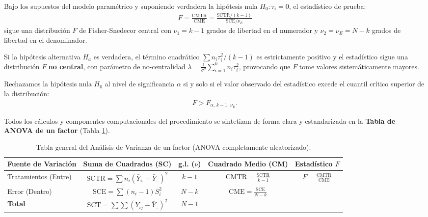 \begin{teorema}
	Bajo los supuestos del modelo paramétrico y suponiendo verdadera la hipótesis nula $H_0: \tau_i = 0$, el estadístico de prueba:
	\begin{align}
		F = \frac{\text{CMTR}}{\text{CME}} = \frac{\text{SCTR} / (k - 1)}{\text{SCE} / \nu_E}
	\end{align}
	sigue una distribución $F$ de Fisher-Snedecor central con $\nu_1 = k - 1$ grados de libertad en el numerador y $\nu_2 = \nu_E = N - k$ grados de libertad en el denominador.

	Si la hipótesis alternativa $H_a$ es verdadera, el término cuadrático $\sum n_i \tau_i^2 / (k-1)$ es estrictamente positivo y el estadístico sigue una distribución $F$ \textbf{no central}, con parámetro de no-centralidad $\lambda = \frac{1}{\sigma^2}\sum_{i=1}^k n_i \tau_i^2$, provocando que $F$ tome valores sistemáticamente mayores.

	Rechazamos la hipótesis nula $H_0$ al nivel de significancia $\alpha$ si y solo si el valor observado del estadístico excede el cuantil crítico superior de la distribución:
	\begin{align}
		F > F_{\alpha, \, k-1, \, \nu_E}.
	\end{align}
\end{teorema}

Todos los cálculos y componentes computacionales del procedimiento se sintetizan de forma clara y estandarizada en la \textbf{Tabla de ANOVA de un factor} (Tabla \ref{tab:anova_un_factor}).

\begin{table}[htbp]
	\centering
	\caption{Tabla general del Análisis de Varianza de un factor (ANOVA completamente aleatorizado).}
	\label{tab:anova_un_factor}
	\begin{tabular}{lcccc}
		\hline
		\textbf{Fuente de Variación} & \textbf{Suma de Cuadrados (SC)} & \textbf{g.l. ($\nu$)} & \textbf{Cuadrado Medio (CM)} & \textbf{Estadístico $F$} \\ \hline
		Tratamientos (Entre) & $\text{SCTR} = \sum n_i (\bar{Y}_{i.} - \bar{Y}_{..})^2$ & $k - 1$ & $\text{CMTR} = \frac{\text{SCTR}}{k - 1}$ & $F = \frac{\text{CMTR}}{\text{CME}}$ \\ [1.5ex]
		Error (Dentro) & $\text{SCE} = \sum (n_i - 1) S_i^2$ & $N - k$ & $\text{CME} = \frac{\text{SCE}}{N - k}$ & \\ [1.5ex] \hline
		\textbf{Total} & $\text{SCT} = \sum \sum (Y_{ij} - \bar{Y}_{..})^2$ & $N - 1$ & & \\ \hline
	\end{tabular}
\end{table}

